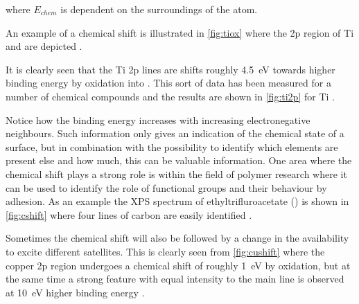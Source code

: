 \noindent where $E_{chem}$ is dependent on the surroundings of the atom.

An example of a chemical shift is illustrated in \autoref{fig:tiox} where the 2p region of Ti and  are depicted \cite{perkin}.

It is clearly seen that the Ti 2p lines are shifts roughly \SI{4.5}{\electronvolt} towards higher binding energy by oxidation into . This sort of data has been measured for a number of chemical compounds and the results are shown in \autoref{fig:ti2p} for Ti \cite{perkin}.

Notice how the binding energy increases with increasing electronegative neighbours. Such information  only gives an indication of the chemical state of a surface, but in combination with the possibility to identify which elements are present else and how much, this can be  valuable information. One area where the chemical shift plays a strong role is within the field of polymer research where it can be used to identify the role of functional groups and their behaviour by adhesion. As an example the XPS spectrum of ethyltrifluroacetate () is shown in \autoref{fig:cshift} where four lines of carbon are easily  identified \cite{ghosh}.

Sometimes the chemical shift will also be followed by a change in the availability to excite different satellites. This is clearly seen from \autoref{fig:cushift} where the copper 2p region undergoes a chemical shift of roughly \SI{1}{\electronvolt} by oxidation, but at the same time a strong feature with equal intensity to the main line is observed at \SI{10}{\electronvolt} higher binding energy \cite{perkin}.

